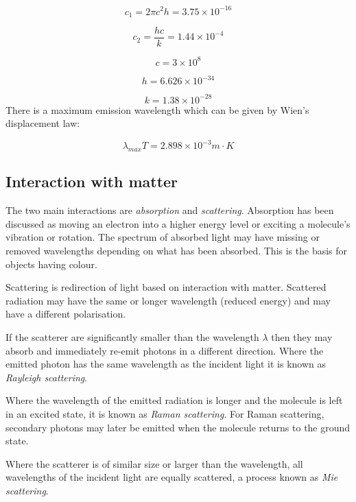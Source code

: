 \begin{equation}
c_1 = 2\pi c^2 h = 3.75\times10^{-16}
\end{equation}

\begin{equation}
c_2 = \frac{hc}{k} = 1.44\times10^{-4}
\end{equation}

\begin{equation}
c = 3\times10^8
\end{equation}

\begin{equation}
h = 6.626\times10^{-34}
\end{equation}

\begin{equation}
k = 1.38\times10^{-28}
\end{equation}
There is a maximum emission wavelength which can be given by Wien's displacement law:

\begin{equation}
	\lambda_{max}T = 2.898\times10^{-3}m\cdot K
\end{equation}	

\subsection{Interaction with matter}
The two main interactions are {\it absorption} and {\it scattering}. 
Absorption has been discussed as moving an electron into a higher energy level or exciting a molecule's vibration or rotation. The spectrum of absorbed light may have missing or removed wavelengths depending on what has been absorbed. This is the basis for objects having colour.

Scattering is redirection of light based on interaction with matter. Scattered radiation may have the same or longer wavelength (reduced energy) and may have a different polarisation. 

If the scatterer are significantly smaller than the wavelength $\lambda$ then they may absorb and immediately re-emit photons in a different direction. Where the emitted photon has the same wavelength as the incident light it is known as {\it Rayleigh scattering}. 

Where the wavelength of the emitted radiation is longer and the molecule is left in an excited state, it is known as {\it Raman scattering}. For Raman scattering, secondary photons may later be emitted when the molecule returns to the ground state.

Where the scatterer is of similar size or larger than the wavelength, all wavelengths of the incident light are equally scattered, a process known as {\it Mie scattering}. 

